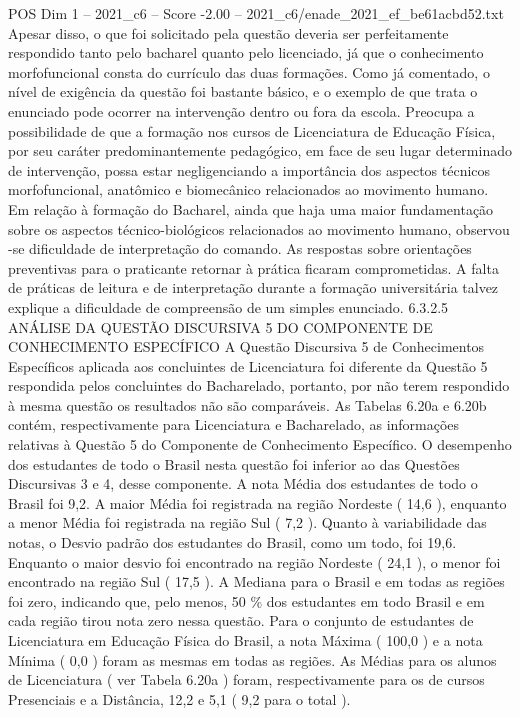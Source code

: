 \begin{textsample}{POS Dim 1 – 2021\_c6 – Score -2.00 – 2021\_c6/enade\_2021\_ef\_be61acbd52.txt}
Apesar disso, o que foi solicitado pela questão deveria ser perfeitamente respondido tanto pelo bacharel quanto pelo licenciado, já que o conhecimento morfofuncional consta do currículo das duas formações.
Como já comentado, o nível de exigência da questão foi bastante básico, e o exemplo de que trata o enunciado pode ocorrer na intervenção dentro ou fora da escola.
Preocupa a possibilidade de que a formação nos cursos de Licenciatura de Educação Física, por seu caráter predominantemente pedagógico, em face de seu lugar determinado de intervenção, possa estar negligenciando a importância dos aspectos técnicos morfofuncional, anatômico e biomecânico relacionados ao movimento humano.
Em relação à formação do Bacharel, ainda que haja uma maior fundamentação sobre os aspectos técnico-biológicos relacionados ao movimento humano, observou -se dificuldade de interpretação do comando.
As respostas sobre orientações preventivas para o praticante retornar à prática ficaram comprometidas.
A falta de práticas de leitura e de interpretação durante a formação universitária talvez explique a dificuldade de compreensão de um simples enunciado. 6.3.2.5 ANÁLISE DA QUESTÃO DISCURSIVA 5 DO COMPONENTE DE CONHECIMENTO ESPECÍFICO A Questão Discursiva 5 de Conhecimentos Específicos aplicada aos concluintes de Licenciatura foi diferente da Questão 5 respondida pelos concluintes do Bacharelado, portanto, por não terem respondido à mesma questão os resultados não são comparáveis.
As Tabelas 6.20a e 6.20b contém, respectivamente para Licenciatura e Bacharelado, as informações relativas à Questão 5 do Componente de Conhecimento Específico.
O desempenho dos estudantes de todo o Brasil nesta questão foi inferior ao das Questões Discursivas 3 e 4, desse componente.
A nota Média dos estudantes de todo o Brasil foi 9,2.
A maior Média foi registrada na região Nordeste ( 14,6 ), enquanto a menor Média foi registrada na região Sul ( 7,2 ).
Quanto à variabilidade das notas, o Desvio padrão dos estudantes do Brasil, como um todo, foi 19,6.
Enquanto o maior desvio foi encontrado na região Nordeste ( 24,1 ), o menor foi encontrado na região Sul ( 17,5 ).
A Mediana para o Brasil e em todas as regiões foi zero, indicando que, pelo menos, 50 \% dos estudantes em todo Brasil e em cada região tirou nota zero nessa questão.
Para o conjunto de estudantes de Licenciatura em Educação Física do Brasil, a nota Máxima ( 100,0 ) e a nota Mínima ( 0,0 ) foram as mesmas em todas as regiões.
As Médias para os alunos de Licenciatura ( ver Tabela 6.20a ) foram, respectivamente para os de cursos Presenciais e a Distância, 12,2 e 5,1 ( 9,2 para o total ).

\end{textsample}
